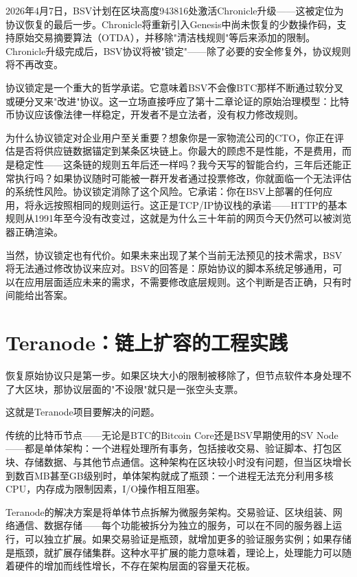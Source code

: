\documentclass[a4paper,12pt,openany]{ctexbook}
\begin{document}
2026年4月7日，BSV计划在区块高度943816处激活Chronicle升级——这被定位为协议恢复的最后一步。Chronicle将重新引入Genesis中尚未恢复的少数操作码，支持原始交易摘要算法（OTDA），并移除"清洁栈规则"等后来添加的限制。Chronicle升级完成后，BSV协议将被"锁定"——除了必要的安全修复外，协议规则将不再改变。

协议锁定是一个重大的哲学承诺。它意味着BSV不会像BTC那样不断通过软分叉或硬分叉来"改进"协议。这一立场直接呼应了第十二章论证的原始治理模型：比特币协议应该像法律一样稳定，开发者不是立法者，没有权力修改规则。

为什么协议锁定对企业用户至关重要？想象你是一家物流公司的CTO，你正在评估是否将供应链数据锚定到某条区块链上。你最大的顾虑不是性能，不是费用，而是稳定性——这条链的规则五年后还一样吗？我今天写的智能合约，三年后还能正常执行吗？如果协议随时可能被一群开发者通过投票修改，你就面临一个无法评估的系统性风险。协议锁定消除了这个风险。它承诺：你在BSV上部署的任何应用，将永远按照相同的规则运行。这正是TCP/IP协议栈的承诺——HTTP的基本规则从1991年至今没有改变过，这就是为什么三十年前的网页今天仍然可以被浏览器正确渲染。

当然，协议锁定也有代价。如果未来出现了某个当前无法预见的技术需求，BSV将无法通过修改协议来应对。BSV的回答是：原始协议的脚本系统足够通用，可以在应用层面适应未来的需求，不需要修改底层规则。这个判断是否正确，只有时间能给出答案。


\section*{Teranode：链上扩容的工程实践}


恢复原始协议只是第一步。如果区块大小的限制被移除了，但节点软件本身处理不了大区块，那协议层面的"不设限"就只是一张空头支票。

这就是Teranode项目要解决的问题。

传统的比特币节点——无论是BTC的Bitcoin Core还是BSV早期使用的SV Node——都是单体架构：一个进程处理所有事务，包括接收交易、验证脚本、打包区块、存储数据、与其他节点通信。这种架构在区块较小时没有问题，但当区块增长到数百MB甚至GB级别时，单体架构就成了瓶颈：一个进程无法充分利用多核CPU，内存成为限制因素，I/O操作相互阻塞。

Teranode的解决方案是将单体节点拆解为微服务架构。交易验证、区块组装、网络通信、数据存储——每个功能被拆分为独立的服务，可以在不同的服务器上运行，可以独立扩展。如果交易验证是瓶颈，就增加更多的验证服务实例；如果存储是瓶颈，就扩展存储集群。这种水平扩展的能力意味着，理论上，处理能力可以随着硬件的增加而线性增长，不存在架构层面的容量天花板。
\end{document}
